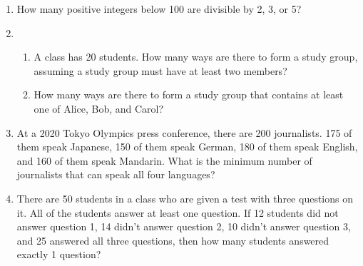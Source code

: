 \documentclass[12pt]{article}
\begin{document}
\begin{enumerate}
	\item How many positive integers below 100 are divisible by 2, 3, or 5?
	\vfill
	\item \begin{enumerate}
		\item A class has 20 students. How many ways are there to form a study group, assuming a study group must have at least two members?
		\vfill
		\item How many ways are there to form a study group that contains at least one of Alice, Bob, and Carol?
	\end{enumerate}
	\vfill

	\item At a 2020 Tokyo Olympics press conference, there are 200 journalists. 175 of them speak Japanese, 150 of them speak German, 180 of them speak English, and 160 of them speak Mandarin. What is the minimum number of journalists that can speak all four languages?
	\vfill

	\item There are 50 students in a class who are given a test with three questions on it. All of the students answer at least one question. If 12 students did not answer question 1, 14 didn't answer question 2, 10 didn't answer question 3, and 25 answered all three questions, then how many students answered exactly 1 question?
	\vfill
\end{enumerate}
\end{document}
